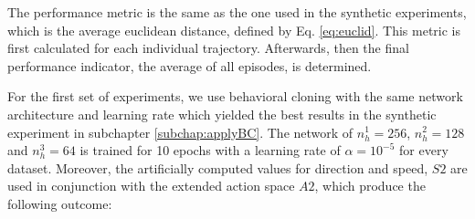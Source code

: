 The performance metric is the same as the one used in the synthetic experiments, which is the average euclidean distance, defined by Eq.  \ref{eq:euclid}. This metric is first calculated for each individual trajectory. Afterwards, then the final performance indicator, the average of all episodes, is determined.
\par
For the first set of experiments, we use behavioral cloning with the same network architecture and learning rate which yielded the best results in the synthetic experiment in subchapter \ref{subchap:applyBC}. The network of $n_h^1=256$, $n_h^2=128$ and $n_h^3=64$ is trained for 10 epochs with a learning rate of $\alpha=10^{-5}$ for every dataset. Moreover, the artificially computed values for direction and speed, $S2$ are used in conjunction with the extended action space $A2$, which produce the following outcome:

